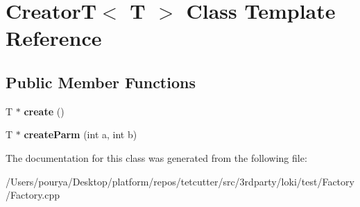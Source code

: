 \hypertarget{classCreatorT}{}\section{Creator\+T$<$ T $>$ Class Template Reference}
\label{classCreatorT}
\subsection*{Public Member Functions}
\begin{DoxyCompactItemize}
\item 
\hypertarget{classCreatorT_ab47f2932c4f799b856682c9d6edfc3d4}{}T $\ast$ {\bfseries create} ()\label{classCreatorT_ab47f2932c4f799b856682c9d6edfc3d4}

\item 
\hypertarget{classCreatorT_a7e276809cc6dd9b49b910981fad3de46}{}T $\ast$ {\bfseries create\+Parm} (int a, int b)\label{classCreatorT_a7e276809cc6dd9b49b910981fad3de46}

\end{DoxyCompactItemize}


The documentation for this class was generated from the following file\+:\begin{DoxyCompactItemize}
\item 
/\+Users/pourya/\+Desktop/platform/repos/tetcutter/src/3rdparty/loki/test/\+Factory/Factory.\+cpp\end{DoxyCompactItemize}

